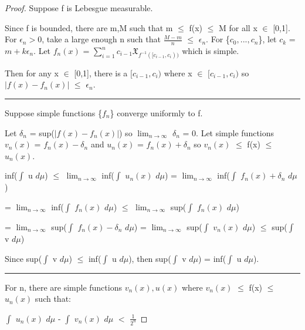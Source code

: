     \begin{proof}
        Suppose f is Lebesgue measurable.

        Since f is bounded, there are m,M such that m $\leq$ f(x) $\leq$ M
        for all x $\in$ [0,1]. For $\epsilon_n > 0$, take a large enough n
        such that $\frac{M-m}{n}$ $\leq$ $\epsilon_n$.
        For \{$c_0,...,c_n$\}, let $c_k$ = $m + k\epsilon_n$.
        Let $f_n(x)$ = $\sum_{i=1}^n c_{i-1}\mathfrak{X}_{f^{-1}([c_{i-1},c_i))}$
        which is simple.

        Then for any x $\in$ [0,1], there is a $[c_{i-1},c_i)$
        where x $\in$ $[c_{i-1},c_i)$ so
        $|f(x) - f_n(x)|$ $\leq$ $\epsilon_n$.

        \rule[0.1cm]{16.7cm}{0.01cm}

        Suppose simple functions \{$f_n$\} converge uniformly to f.

        Let $\delta_n$ = sup($|f(x) - f_n(x)|$) so
        $\lim_{n \rightarrow \infty}$ $\delta_n$ = 0.
        Let simple functions $v_n(x)$ = $f_n(x) - \delta_n$
        and $u_n(x)$ = $f_n(x) + \delta_n$
        so $v_n(x)$ $\leq$ f(x) $\leq$ $u_n(x)$.

        \hspace{0.5cm}
        inf($\int$ u $d\mu$)
        $\leq$ $\lim_{n \rightarrow \infty}$ inf($\int$ $u_n(x)$ $d\mu$)
        = $\lim_{n \rightarrow \infty}$ inf($\int$ $f_n(x) + \delta_n$ $d\mu$)

        \hspace{0.5cm}
        = $\lim_{n \rightarrow \infty}$ inf($\int$ $f_n(x)$ $d\mu$)
        $\leq$ $\lim_{n \rightarrow \infty}$ sup($\int$ $f_n(x)$ $d\mu$)

        \hspace{0.5cm}
        = $\lim_{n \rightarrow \infty}$ sup($\int$ $f_n(x) - \delta_n$ $d\mu$)
        = $\lim_{n \rightarrow \infty}$ sup($\int$ $v_n(x)$ $d\mu$)
        $\leq$ sup($\int$ v $d\mu$)

        Since sup($\int$ v $d\mu$) $\leq$ inf($\int$ u $d\mu$),
        then sup($\int$ v $d\mu$) = inf($\int$ u $d\mu$).

        \rule[0.1cm]{16.7cm}{0.01cm}

        For n, there are simple functions $v_n(x),u(x)$
        where $v_n(x)$ $\leq$ f(x) $\leq$ $u_n(x)$ such that:
        
        \hspace{0.5cm}
        $\int$ $u_n(x)$ $d\mu$ - $\int$ $v_n(x)$ $d\mu$ $<$ $\frac{1}{2^n}$


\end{proof}
